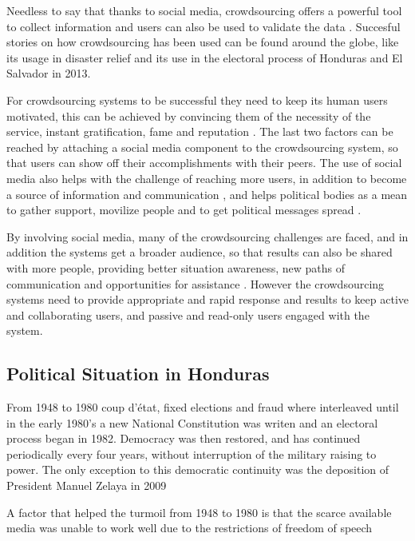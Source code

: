 \documentclass[a4paper,10pt]{article}
\begin{document}
Needless to say that thanks to social media, crowdsourcing offers a powerful tool to collect information and users can also be used to validate the data \citep{gao2011}. Succesful stories on how crowdsourcing has been used can be found around the globe, like its usage in disaster relief \citep{yin2012, gao2011} and its use in the electoral process of Honduras and El Salvador in 2013.

For crowdsourcing systems to be successful they need to keep its human users motivated, this can be achieved by convincing them of the necessity of the service, instant gratification, fame and reputation \citep{doan2011}. The last two factors can be reached by attaching a social media component to the crowdsourcing system, so that users can show off their accomplishments with their peers. The use of social media also helps with the challenge of reaching more users, in addition to become a source of information and communication \citep{yin2012}, and helps political bodies as a mean to gather support, movilize people and to get political messages spread \citep{map2014}.

By involving social media, many of the crowdsourcing challenges are faced, and in addition the systems get a broader audience, so that results can also be shared with more people, providing better situation awareness, new paths of communication and opportunities for assistance \citep{gao2011}. However the crowdsourcing systems need to provide appropriate and rapid response and results to keep active and collaborating users, and passive and read-only users engaged with the system.






\subsection{Political Situation in Honduras}

From 1948 to 1980 coup d'\'{e}tat, fixed elections and fraud where interleaved until in the early 1980's a new National Constitution was writen and an electoral process began in 1982. Democracy was then restored, and has continued periodically every four years, without interruption of the military raising to power. The only exception to this democratic continuity was the deposition of President Manuel Zelaya in 2009 \citep{romero2014}

A factor that helped the turmoil from 1948 to 1980 is that the scarce available media was unable to work well due to the restrictions of freedom of speech \citep{romero2014}
\end{document}
